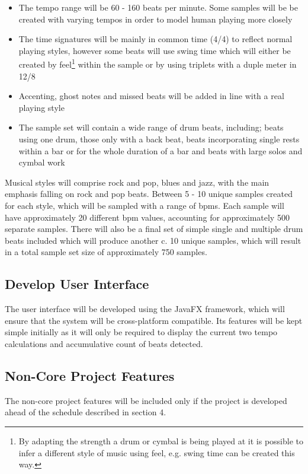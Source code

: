 \documentclass[a4paper, 11pt]{article}
\begin{document}
\begin{itemize}
\item The tempo range will be 60 - 160 beats per minute. Some samples will be be created with varying tempos in order to model human playing more closely
\item The time signatures will be mainly in common time (4/4) to reflect normal playing styles, however some beats will use swing time which will either be created by feel\footnote{By adapting the strength a drum or cymbal is being played at it is possible to infer a different style of music using feel, e.g. swing time can be created this way.} within the sample or by using triplets with a duple meter in 12/8
\item Accenting, ghost notes and missed beats will be added in line with a real playing style
\item The sample set will contain a wide range of drum beats, including; beats using one drum, those only with a back beat, beats incorporating single rests within a bar or for the whole duration of a bar and beats with large solos and cymbal work
\end{itemize} 

Musical styles will comprise rock and pop, blues and jazz, with the main emphasis falling on rock and pop beats. Between 5 - 10 unique samples created for each style, which will be sampled with a range of bpms. Each sample will have approximately 20 different bpm values, accounting for approximately 500 separate samples. There will also be a final set of simple single and multiple drum beats included which will produce another c. 10 unique samples, which will result in a total sample set size of approximately 750 samples.

\subsection{Develop User Interface}
The user interface will be developed using the JavaFX framework, which will ensure that the system will be cross-platform compatible. Its features will be kept simple initially as it will only be required to display the current two tempo calculations and accumulative count of beats detected.

\subsection{Non-Core Project Features}
The non-core project features will be included only if the project is developed ahead of the schedule described in section 4. 
\end{document}
